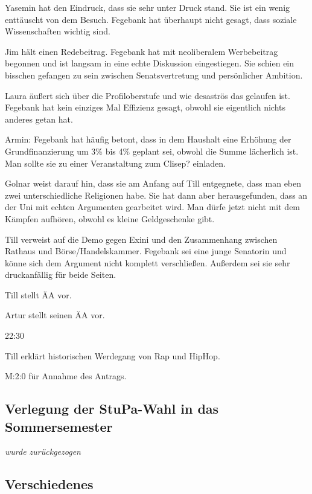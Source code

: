 \documentclass[ngerman,headheight=70pt]{scrartcl}
\begin{document}
    Yasemin hat den Eindruck, dass sie sehr unter Druck stand. Sie ist ein
    wenig enttäuscht von dem Besuch. Fegebank hat überhaupt nicht
    gesagt, dass soziale Wissenschaften wichtig sind.

    Jim hält einen Redebeitrag. Fegebank hat mit neoliberalem Werbebeitrag
    begonnen und ist langsam in eine echte Diskussion eingestiegen.
    Sie schien ein bisschen gefangen zu sein zwischen Senatsvertretung und
    persönlicher Ambition.

    Laura äußert sich über die Profiloberstufe und wie desaströs das gelaufen
    ist. Fegebank hat kein einziges Mal Effizienz gesagt, obwohl sie eigentlich
    nichts anderes getan hat.

    Armin: Fegebank hat häufig betont, dass in dem Haushalt eine Erhöhung
    der Grundfinanzierung um 3\% bis 4\% geplant sei, obwohl die Summe lächerlich
    ist. Man sollte sie zu einer Veranstaltung zum Clisep? einladen.

    Golnar weist darauf hin, dass sie am Anfang auf Till entgegnete, dass
    man eben zwei unterschiedliche Religionen habe. Sie hat dann aber herausgefunden,
    dass an der Uni mit echten Argumenten gearbeitet wird.
    Man dürfe jetzt nicht mit dem Kämpfen aufhören, obwohl es kleine Geldgeschenke
    gibt.

    Till verweist auf die Demo gegen Exini und den Zusammenhang zwischen
    Rathaus und Börse/Handelskammer. Fegebank sei eine junge Senatorin und könne
    sich dem Argument nicht komplett verschließen. Außerdem sei sie sehr
    druckanfällig für beide Seiten.

    Till stellt ÄA vor.

    Artur stellt seinen ÄA vor.

    22:30

    Till erklärt historischen Werdegang von Rap und HipHop.

    M:2:0 für Annahme des Antrags.

    \subsection{Verlegung der StuPa-Wahl in das Sommersemester}

    \textit{wurde zurückgezogen}

    \subsection{Verschiedenes}
\end{document}

